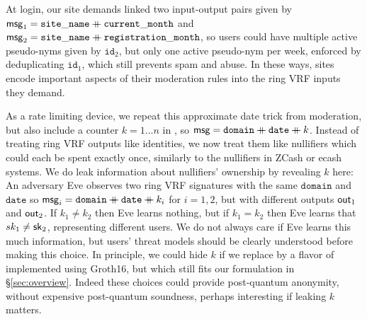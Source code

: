 At login, our site demands linked two input-output pairs given by
$\mathsf{msg}_1 = \mathtt{site\_name} \mathbin{+\mkern-10mu+} \mathtt{current\_month}$ and
$\mathsf{msg}_2 = \mathtt{site\_name} \mathbin{+\mkern-10mu+} \mathtt{registration\_month}$,
so users could have multiple active pseudo-nyms given by $\mathtt{id}_2$,
but only one active pseudo-nym per week, enforced by deduplicating
$\mathtt{id}_1$, which still prevents spam and abuse.
In these ways, sites encode important aspects of their moderation rules
into the ring VRF inputs they demand.  


As a rate limiting device, we repeat this approximate date trick from
moderation, but also include a counter $k = 1 \ldots n$ in \msg, so
 $\mathsf{msg} = \mathtt{domain} \mathbin{+\mkern-10mu+} \mathtt{date} \mathbin{+\mkern-10mu+} k$.
Instead of treating ring VRF outputs like identities,
we now treat them like nullifiers which could each be spent exactly once,
 similarly to the nullifiers in ZCash or ecash systems.
We do leak information about nullifiers' ownership by revealing $k$ here:
An adversary Eve observes two ring VRF signatures with the same
$\mathtt{domain}$ and $\mathtt{date}$ so
$\mathsf{msg}_i = \mathtt{domain} \mathbin{+\mkern-10mu+} \mathtt{date} \mathbin{+\mkern-10mu+} k_i$
for $i=1,2$, but with different outputs ${\mathsf{out}}_1$ and ${\mathsf{out}}_2$.
If $k_1 \ne k_2$ then Eve learns nothing, but if $k_1 = k_2$ then
Eve learns that $sk_1 \ne \mathsf{sk}_2$, representing different users. 
We do not always care if Eve learns this much information, but users'
threat models should be clearly understood before making this choice.
In principle, we could hide $k$ if we replace \PedVRF by a flavor of
\Reval implemented using Groth16, 
 but which still fits our formulation in \S\ref{sec:overview}.
Indeed these \Reval choices could provide post-quantum anonymity, 
without expensive post-quantum soundness, perhaps interesting if leaking $k$ matters.


